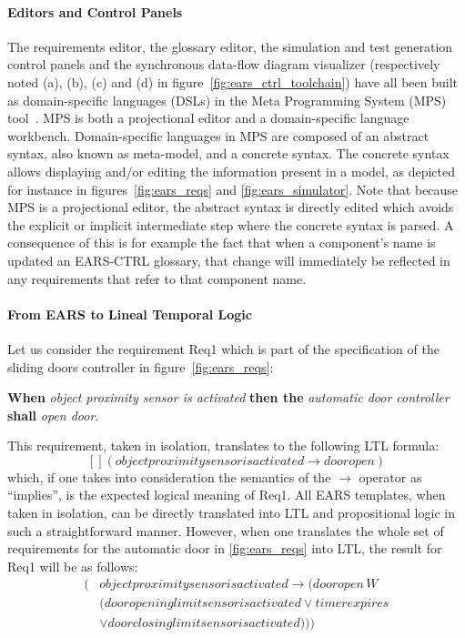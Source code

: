 \paragraph{\textbf{Editors and Control Panels}} 
The requirements editor, the glossary editor, the simulation and
test generation control panels and the synchronous data-flow diagram visualizer
(respectively noted (\textsf{a}), (\textsf{b}), (\textsf{c}) and (\textsf{d}) in figure~\ref{fig:ears_ctrl_toolchain}) have all been built as 
domain-specific languages (DSLs) in the Meta Programming System (MPS)
tool~\cite{mps}.
MPS is both a projectional editor and a domain-specific language workbench.
Domain-specific languages in MPS are composed of an abstract syntax, also known
as meta-model, and a concrete syntax. The concrete syntax allows displaying
and/or editing the information present in a model, as depicted for instance in
figures~\ref{fig:ears_reqs} and  \ref{fig:ears_simulator}. Note that because MPS
is a projectional editor, the abstract syntax is directly edited which avoids the explicit or implicit
intermediate step where the concrete syntax is parsed.
A consequence of this is for example the fact that when a component's
name is updated an \textsf{EARS-CTRL} glossary, that change will immediately be
reflected in any requirements that refer to that component name.\\
\paragraph{\textbf{From EARS to Lineal Temporal Logic}}
\label{sec:ears_LTL} 
Let us consider the requirement \textsf{Req1} which is part of the
specification of the sliding doors controller in figure~\ref{fig:ears_reqs}:
\begin{center}
\textbf{When} \emph{object proximity sensor is activated} \textbf{then the} \emph{automatic door controller} \textbf{shall}
\emph{open door}.
\end{center}
This requirement, taken in isolation, translates to the following LTL
 formula:
$$[] (objectproximitysensorisactivated \rightarrow dooropen)$$
which, if one takes into consideration the semantics of the $\rightarrow$
operator as ``implies'', is the expected logical meaning of \textsf{Req1}. All
EARS templates, when taken in isolation, can be directly translated into LTL and
propositional logic in such a straightforward manner. However, when one
translates the whole set of requirements for the automatic door in \ref{fig:ears_reqs} into
LTL, the result for \textsf{Req1} will be as follows:
\begin{align*}
[] (&objectproximitysensorisactivated \rightarrow (dooropen\,W\\
 & (dooropeninglimitsensorisactivated \lor timerexpires\\
 & \lor doorclosinglimitsensorisactivated )))
\end{align*}

